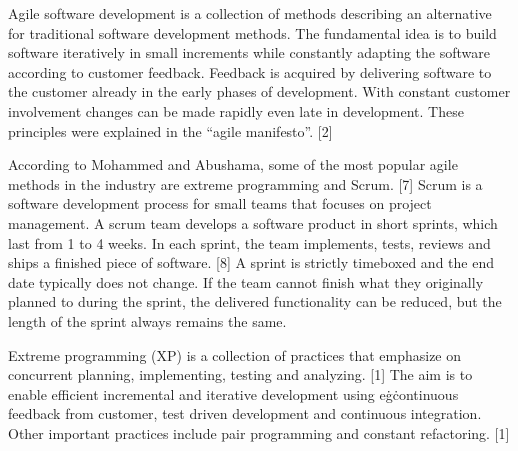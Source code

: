 Agile software development is a collection of methods describing an
alternative for traditional software development methods. The fundamental
idea is to build software iteratively in small increments while
constantly adapting the software according to customer feedback.
Feedback is acquired by delivering software to the customer already in
the early phases of development. With constant customer involvement
changes can be made rapidly even late in development. These principles were
explained in the ``agile manifesto''. [2]

According to Mohammed and Abushama, some of the most popular agile
methods in the industry are extreme programming and Scrum. [7] Scrum is
a software development process for small teams that focuses on project
management. A scrum team develops a software product in short sprints,
which last from 1 to 4 weeks. In each sprint, the team implements,
tests, reviews and ships a finished piece of software. [8] A sprint is
strictly timeboxed and the end date typically does not change. If the
team cannot finish what they originally planned to during the sprint,
the delivered functionality can be reduced, but the length of the sprint
always remains the same.

Extreme programming (XP) is a collection of practices that emphasize
on concurrent planning, implementing, testing and analyzing. [1] The
aim is to enable efficient incremental and iterative development
using e\.g\. continuous feedback from customer, test driven development
and continuous integration. Other important practices include pair
programming and constant refactoring. [1]

